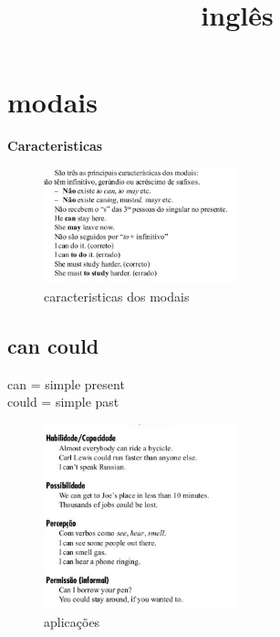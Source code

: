 \documentclass[16pt]{article}
\date{} %
\title{inglês}
\begin{document}
\maketitle
\section{modais}
\textbf{
  Caracteristicas
}
\begin{figure}[htbp]
  \centering
  \includegraphics[width=0.5\textwidth]{carac.png}
  \caption{caracteristicas dos modais}
\end{figure}


\subsection{can could}
can = simple present\\
could = simple past
\begin{figure}[htbp]
  \centering
  \includegraphics[width=0.5\textwidth]{can-could.png}
  \caption{aplicações}
\end{figure}
\end{document}
